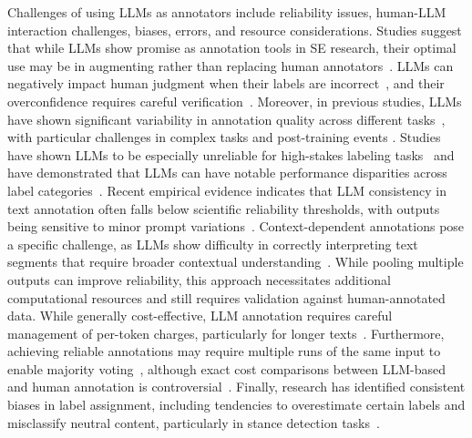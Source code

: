 Challenges of using LLMs as annotators include reliability issues, human-LLM interaction challenges, biases, errors, and resource considerations.
Studies suggest that while LLMs show promise as annotation tools in SE research, their optimal use may be in augmenting rather than replacing human annotators~\cite{DBLP:conf/emnlp/WangLXZZ21, DBLP:conf/chi/HeHDRH24}. %
LLMs can negatively impact human judgment when their labels are incorrect~\cite{DBLP:conf/www/HuangKA23a}, and their overconfidence requires careful verification~\cite{DBLP:conf/kdd/WanSJKCNSSWYABJ24}.
Moreover, in previous studies, LLMs have shown significant variability in annotation quality across different tasks~\cite{DBLP:conf/www/HuangKA23a,DBLP:conf/chi/Wang0RMM24, DBLP:journals/corr/abs-2306-00176}, with particular challenges in complex tasks and post-training events . Studies have shown LLMs to be especially unreliable for high-stakes labeling tasks~\cite{DBLP:conf/chi/Wang0RMM24} and have demonstrated that LLMs can have notable performance disparities across label categories~\cite{DBLP:journals/corr/abs-2304-10145}. Recent empirical evidence indicates that LLM consistency in text annotation often falls below scientific reliability thresholds, with outputs being sensitive to minor prompt variations~\cite{DBLP:journals/corr/abs-2304-11085}.
Context-dependent annotations pose a specific challenge, as LLMs show difficulty in correctly interpreting text segments that require broader contextual understanding~\cite{DBLP:conf/chi/HeHDRH24}.
While pooling multiple outputs can improve reliability, this approach necessitates additional computational resources and still requires validation against human-annotated data.
While generally cost-effective, LLM annotation requires careful management of per-token charges, particularly for longer texts~\cite{DBLP:conf/emnlp/WangLXZZ21}. Furthermore, achieving reliable annotations may require multiple runs of the same input to enable majority voting~\cite{DBLP:journals/corr/abs-2304-11085}, although exact cost comparisons between LLM-based and human annotation is controversial~\cite{DBLP:conf/chi/HeHDRH24}.
Finally, research has identified consistent biases in label assignment, including tendencies to overestimate certain labels and misclassify neutral content, particularly in stance detection tasks~\cite{DBLP:journals/corr/abs-2304-10145}. %


